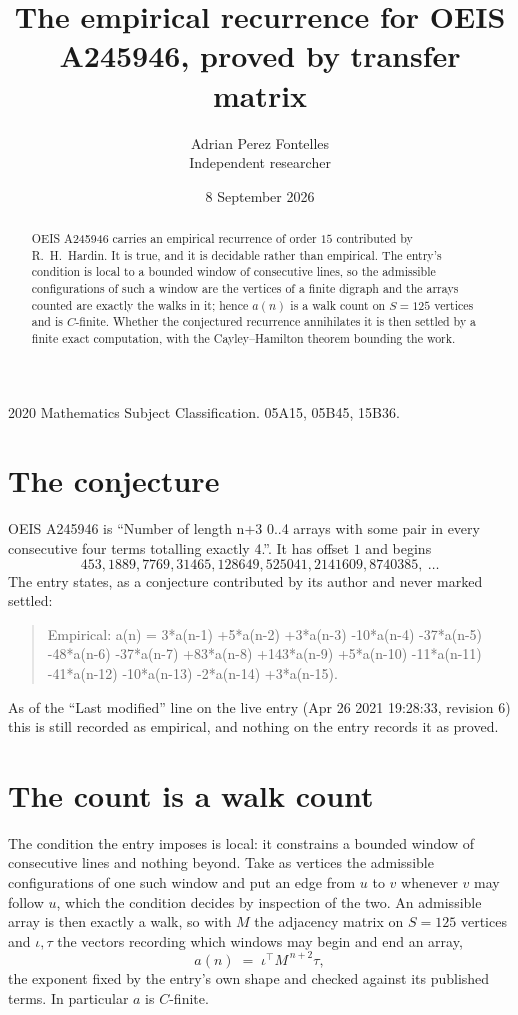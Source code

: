 \documentclass[11pt,a4paper]{article}
\title{The empirical recurrence for OEIS A245946, proved by transfer matrix}
\author{Adrian Perez Fontelles\\ \small Independent researcher}
\date{8 September 2026}
\theoremstyle{plain}
\theoremstyle{definition}
\begin{document}
\maketitle

\begin{abstract}
OEIS A245946 carries an empirical recurrence of order $15$ contributed by R.~H.~Hardin. It is
true, and it is decidable rather than empirical. The entry's condition is local to a bounded window of consecutive lines, so
the admissible configurations of such a window are the vertices of a finite digraph and the
arrays counted are exactly the walks in it; hence $a(n)$ is a walk count on $S=125$ vertices
and is $C$-finite. Whether the conjectured recurrence annihilates it is then settled by a
finite exact computation, with the Cayley--Hamilton theorem bounding the work.
\end{abstract}

\noindent\small 2020 Mathematics Subject Classification. 05A15, 05B45, 15B36.\normalsize

\section{The conjecture}

OEIS A245946 is ``Number of length n+3 0..4 arrays with some pair in every consecutive four terms totalling exactly 4.''. It has offset $1$ and begins
\[
453, 1889, 7769, 31465, 128649, 525041, 2141609, 8740385,\ \dots
\]
The entry states, as a conjecture contributed by its author and never marked settled:
\begin{quote}
Empirical: a(n) = 3*a(n-1) +5*a(n-2) +3*a(n-3) -10*a(n-4) -37*a(n-5) -48*a(n-6) -37*a(n-7) +83*a(n-8) +143*a(n-9) +5*a(n-10) -11*a(n-11) -41*a(n-12) -10*a(n-13) -2*a(n-14) +3*a(n-15).
\end{quote}
As of the ``Last modified'' line on the live entry (Apr 26 2021 19:28:33, revision 6) this is still
recorded as empirical, and nothing on the entry records it as proved.

\section{The count is a walk count}

The condition the entry imposes is local: it constrains a bounded window of consecutive lines and nothing beyond. Take as
vertices the admissible configurations of one such window and put an edge from $u$ to $v$
whenever $v$ may follow $u$, which the condition decides by inspection of the two. An
admissible array is then exactly a walk, so with $M$ the adjacency matrix on $S=125$ vertices
and $\iota,\tau$ the vectors recording which windows may begin and end an array,
\[
a(n)\;=\;\iota^{\!\top}M^{\,n+2}\tau ,
\]
the exponent fixed by the entry's own shape and checked against its published terms. In
particular $a$ is $C$-finite.
\end{document}
